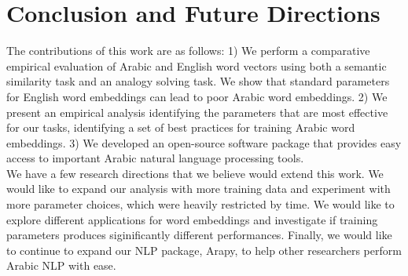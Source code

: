 \chapter{Conclusion and Future Directions}
\label{sec:conclusion}

The contributions of this work are as follows: 1) We perform a comparative empirical evaluation of Arabic and English word vectors using both a semantic similarity task and an analogy solving task. We show that standard parameters for English word embeddings can lead to poor Arabic word embeddings. 2) We present an empirical analysis identifying the parameters that are most effective for our tasks, identifying a set of best practices for training Arabic word embeddings. 3) We developed an open-source software package that provides easy access to important Arabic natural language processing tools. 
\\
We have a few research directions that we believe would extend this work. We would like to expand our analysis with more training data and experiment with more parameter choices, which were heavily restricted by time. We would like to explore different applications for word embeddings and investigate if training parameters produces siginificantly different performances. Finally, we would like to continue to expand our NLP package, Arapy, to help other researchers perform Arabic NLP with ease.